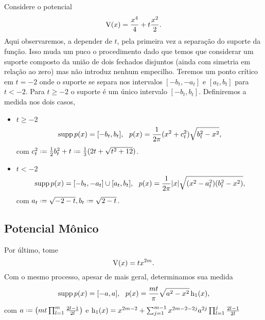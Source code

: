 Considere o potencial $$\operatorname{V}(x) = \frac{x^4}{4} + t \frac{x^2}{2}.$$ Aqui observaremos, a depender de $t$, pela primeira vez a separação do suporte da função. Isso muda um puco o procedimento dado que temos que considerar um suporte composto da união de dois fechados disjuntos (ainda com simetria em relação ao zero) mas não introduz nenhum empecilho. Teremos um ponto crítico em $t=-2$ onde o suporte se separa nos intervalos $[-b_t, -a_t]$ e $[a_t, b_t]$ para $t < -2$. Para $t \geq -2$ o suporte é um único intervalo $[-b_t, b_t]$. Definiremos a medida nos dois casos,
\begin{itemize}
	\item \(t \geq -2\)
	\begin{equation}
	\operatorname{supp} p(x) = [-b_t, b_t], \ \ p(x) = \frac{1}{2\pi} (x^2 + c_t^2) \sqrt{b_t^2 - x^2},\label{Equação: Quartico +}
	\end{equation}
	com $c_t^2 \deff\frac{1}{2} b_t^2 + t \deff \frac{1}{3} (2t + \sqrt{t^2 + 12})$.
	\item \(t < -2\)
	\begin{equation}
	\operatorname{supp} p(x) = [-b_t, -a_t] \cup [a_t, b_t], \ \ p(x) = \frac{1}{2\pi} |x| \sqrt{(x^2 - a_t^2)(b_t^2 - x^2)},
	\label{Equação: Quartico -}
	\end{equation}
	com $ a_t \deff \sqrt{-2-t}, b_t \deff \sqrt{2-t}$.
\end{itemize}





\subsection{Potencial Mônico}
 
 Por último, tome $$\operatorname{V}(x) = t x^{2m}.$$ Com o mesmo processo, apesar de mais geral, determinamos sua medida 
 \begin{equation}
 	\operatorname{supp} p(x) = [-a, a], \ \ p(x) = \frac{mt}{\pi} \sqrt{a^2 - x^2} \operatorname{h_1}(x),
 	\label{Equação: Mônico}
 \end{equation}
com $ a \deff \left( mt \prod_{l=1}^{m} \frac{2l-1}{2l}\right)$ e $\operatorname{h_1}(x) = x^{2m-2} + \sum_{j=1}^{m-1} x^{2m-2-2j} a^{2j} \prod_{l=1}^{j} \frac{2l-1}{2l}$


